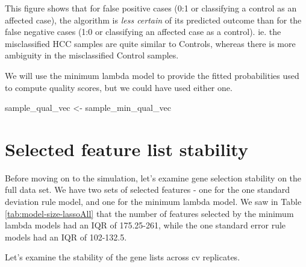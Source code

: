 \documentclass[
]{book}
\newenvironment{Shaded}{\begin{snugshade}}{\end{snugshade}}
\newcommand{\NormalTok}[1]{#1}
\newcommand{\StringTok}[1]{\textcolor[rgb]{0.31,0.60,0.02}{#1}}
\begin{document}
This figure shows that for false positive cases (0:1 or classifying a
control as an affected case), the algorithm is \emph{less certain} of its predicted
outcome than for the false negative cases (1:0 or classifying an affected case as a control).
ie. the misclassified HCC samples are quite similar to Controls, whereas there
is more ambiguity in the misclassified Control samples.

We will use the minimum lambda model to provide
the fitted probabilities used to compute quality scores,
but we could have used either one.

\begin{Shaded}
\begin{Highlighting}[]
\NormalTok{sample\_qual\_vec <{-}}\StringTok{ }\NormalTok{sample\_min\_qual\_vec}
\end{Highlighting}
\end{Shaded}

\hypertarget{selected-feature-list-stability}{%
\section{Selected feature list stability}\label{selected-feature-list-stability}}

Before moving on to the simulation, let's examine gene selection stability on the
full data set. We have two sets of selected features - one for the
one standard deviation rule model, and one for the minimum lambda model.
We saw in Table \ref{tab:model-size-lassoAll} that the number of features
selected by the minimum lambda models had an IQR of
175.25-261,
while the one standard error rule models had an IQR of
102-132.5.

Let's examine the stability of the gene lists across cv replicates.
\end{document}
